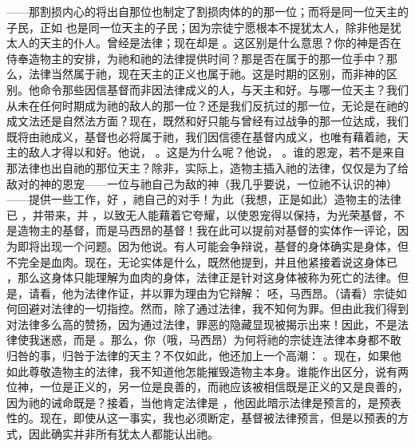 ——那割损内心的将出自那位也制定了割损肉体的的那一位；而将是同一位天主的子民，正如  也是同一位天主的子民；因为宗徒宁愿根本不提犹太人，除非他是犹太人的天主的仆人。曾经是法律；现在却是 。这区别是什么意思？你的神是否在侍奉造物主的安排，为祂和祂的法律提供时间？那是否在属于的那一位手中？那么，法律当然属于祂，现在天主的正义也属于祂。这是时期的区别，而非神的区别。他命令那些因信基督而非因法律成义的人，与天主和好。与哪一位天主？我们从未在任何时期成为祂的敌人的那一位？还是我们反抗过的那一位，无论是在祂的成文法还是自然法方面？现在，既然和好只能与曾经有过战争的那一位达成，我们既将由祂成义，基督也必将属于祂，我们因信德在基督内成义，也唯有藉着祂，天主的敌人才得以和好。他说， 。这是为什么呢？他说， 。谁的恩宠，若不是来自那法律也出自祂的那位天主？除非，实际上，造物主插入祂的法律，仅仅是为了给敌对的神的恩宠——一位与祂自己为敌的神（我几乎要说，一位祂不认识的神）——提供一些工作，好 ，祂自己的对手！为此（我想，正是如此）造物主的法律已 ，并带来，并 ，以致无人能藉着它夸耀，以使恩宠得以保持，为光荣基督，不是造物主的基督，而是马西昂的基督！我在此可以提前对基督的实体作一评论，因为即将出现一个问题。因为他说。有人可能会争辩说，基督的身体确实是身体，但不完全是血肉。现在，无论实体是什么，既然他提到，并且他紧接着说这身体已 ，那么这身体只能理解为血肉的身体，法律正是针对这身体被称为死亡的法律。但是，请看，他为法律作证，并以罪为理由为它辩解：  呸，马西昂。（请看）宗徒如何回避对法律的一切指控。然而，除了通过法律，我不知何为罪。但由此我们得到对法律多么高的赞扬，因为通过法律，罪恶的隐藏显现被揭示出来！因此，不是法律使我迷惑，而是 。那么，你（哦，马西昂）为何将祂的宗徒连法律本身都不敢归咎的事，归咎于法律的天主？不仅如此，他还加上一个高潮： 。现在，如果他如此尊敬造物主的法律，我不知道他怎能摧毁造物主本身。谁能作出区分，说有两位神，一位是正义的，另一位是良善的，而祂应该被相信既是正义的又是良善的，因为祂的诫命既是？接着，当他肯定法律是 ，他因此暗示法律是预言的，是预表性的。现在，即使从这一事实，我也必须断定，基督被法律预言，但是以预表的方式，因此确实并非所有犹太人都能认出祂。\par

